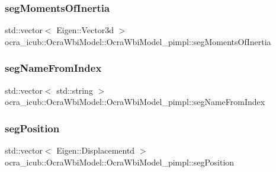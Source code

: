 \hypertarget{structOcraWbiModel_1_1OcraWbiModel__pimpl_a478fcde74e00dc9b8235bbe5a2c2cb75}{}\label{structOcraWbiModel_1_1OcraWbiModel__pimpl_a478fcde74e00dc9b8235bbe5a2c2cb75} 
\subsubsection{\texorpdfstring{seg\+Moments\+Of\+Inertia}{segMomentsOfInertia}}
{\footnotesize\ttfamily std\+::vector$<$ Eigen\+::\+Vector3d $>$ ocra\+\_\+icub\+::\+Ocra\+Wbi\+Model\+::\+Ocra\+Wbi\+Model\+\_\+pimpl\+::seg\+Moments\+Of\+Inertia}

\hypertarget{structOcraWbiModel_1_1OcraWbiModel__pimpl_ad1592df54a2ce8043dc2bc050fd61905}{}\label{structOcraWbiModel_1_1OcraWbiModel__pimpl_ad1592df54a2ce8043dc2bc050fd61905} 
\subsubsection{\texorpdfstring{seg\+Name\+From\+Index}{segNameFromIndex}}
{\footnotesize\ttfamily std\+::vector$<$ std\+::string $>$ ocra\+\_\+icub\+::\+Ocra\+Wbi\+Model\+::\+Ocra\+Wbi\+Model\+\_\+pimpl\+::seg\+Name\+From\+Index}

\hypertarget{structOcraWbiModel_1_1OcraWbiModel__pimpl_a47b0a577b990fa7db3bc04a7a8107c31}{}\label{structOcraWbiModel_1_1OcraWbiModel__pimpl_a47b0a577b990fa7db3bc04a7a8107c31} 
\subsubsection{\texorpdfstring{seg\+Position}{segPosition}}
{\footnotesize\ttfamily std\+::vector$<$ Eigen\+::\+Displacementd $>$ ocra\+\_\+icub\+::\+Ocra\+Wbi\+Model\+::\+Ocra\+Wbi\+Model\+\_\+pimpl\+::seg\+Position}

